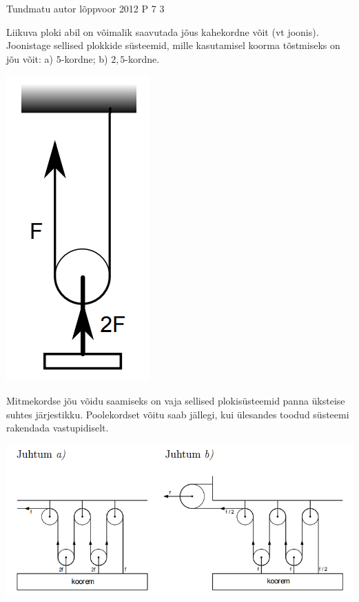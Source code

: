 {Tundmatu autor} %
{lõppvoor} %
{2012} %
{P 7} %
{3} %
{

\ifStatement
Liikuva ploki abil on võimalik saavutada jõus kahekordne võit (vt joonis). Joonistage sellised plokkide süsteemid, mille kasutamisel koorma tõstmiseks on jõu võit: a) $5$-kordne; b) $2,5$-kordne.
\begin{center}
	\includegraphics[width=0.5\linewidth]{2012-v3p-07-yl.PNG}
\end{center}
\fi

\ifHint
Mitmekordse jõu võidu saamiseks on vaja sellised plokisüsteemid panna üksteise suhtes järjestikku. Poolekordset võitu saab jällegi, kui ülesandes toodud süsteemi rakendada vastupidiselt.
\fi

\ifSolution
\begin{center}
	\includegraphics[width=0.5\linewidth]{2012-v3p-07-lah.PNG}
\end{center}
\fi
}